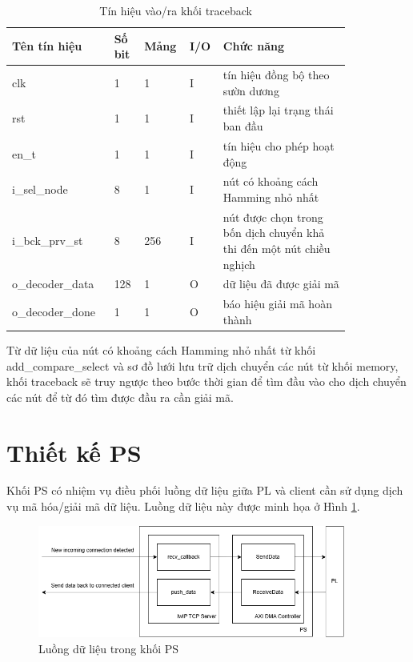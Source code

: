 \documentclass[../DoAn.tex]{subfiles}
\begin{document}
\begin{table}[H]
\centering{}
    \caption{Tín hiệu vào/ra khối traceback}
    \begin{tabular}{|p{0.28\linewidth}|p{0.08\linewidth}|p{0.08\linewidth}|p{0.05\linewidth}|p{0.35\linewidth}|}
        \hline
        \textbf{Tên tín hiệu} & \textbf{Số bit}  & \textbf{Mảng}     & \textbf{I/O}   & \textbf{Chức năng} \\ \hline\hline
        clk  & 1   & 1     & I     & tín hiệu đồng bộ theo sườn dương \\ \hline
        rst   & 1   & 1     & I     & thiết lập lại trạng thái ban đầu\\ \hline
        en\_t  & 1   & 1     & I     & tín hiệu cho phép hoạt động \\ \hline
        i\_sel\_node  & 8   & 1     & I     & nút có khoảng cách Hamming nhỏ nhất  \\ \hline
        i\_bck\_prv\_st  & 8   & 256     & I     & nút được chọn trong bốn dịch chuyển khả thi đến một nút chiều nghịch \\ \hline
        o\_decoder\_data  & 128   & 1     & O     & dữ liệu đã được giải mã  \\ \hline
        o\_decoder\_done  & 1   & 1     & O     & báo hiệu giải mã hoàn thành  \\ \hline
        \end{tabular}
\end{table}

Từ dữ liệu của nút có khoảng cách Hamming nhỏ nhất từ khối add\_compare\_select và sơ đồ lưới lưu trữ dịch chuyển các nút từ khối memory, khối traceback sẽ truy ngược theo bước thời gian để tìm đầu vào cho dịch chuyển các nút để từ đó tìm được đầu ra cần giải mã.

\section{Thiết kế PS}

Khối PS có nhiệm vụ điều phối luồng dữ liệu giữa PL và client cần sử dụng dịch vụ mã hóa/giải mã dữ liệu. Luồng dữ liệu này được minh họa ở Hình \ref{fig:Luồng dữ liệu trong khối PS}.

\begin{figure}[H]
    \centering
    \includegraphics[width=0.9\textwidth, height=0.3\textheight, keepaspectratio]{Hinhve/Chuong 4/PS data flow.png}
    \caption{Luồng dữ liệu trong khối PS}
    \label{fig:Luồng dữ liệu trong khối PS}
\end{figure}
\end{document}
